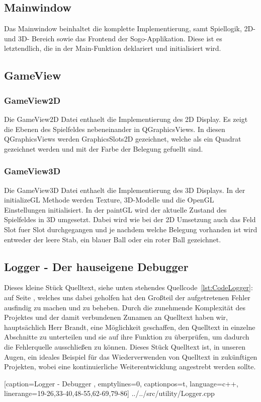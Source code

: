 \documentclass[a4paper]{scrartcl}
\begin{document}
\subsection{Mainwindow}\label{ch:Mainwindow}
Das Mainwindow beinhaltet die komplette Implementierung, samt Spiellogik, 2D- und 3D- Bereich sowie das Frontend der Sogo-Applikation. Diese ist es letztendlich, die in der Main-Funktion deklariert und initialisiert wird.
 
\subsection{GameView}\label{ch:GameView}
\subsubsection{GameView2D}\label{ch:GameView2D}
Die GameView2D Datei enthaelt die Implementierung des 2D Display. Es zeigt die Ebenen des Spielfeldes nebeneinander in QGraphicsViews. In diesen QGraphicsViews werden GraphicsSlots2D gezeichnet, welche als ein Quadrat gezeichnet
werden und mit der Farbe der Belegung gefuellt sind.
\subsubsection{GameView3D}\label{ch:GameView3D}
Die GameView3D Datei enthaelt die Implementierung des 3D Displays. In der initializeGL Methode werden Texture, 3D-Modelle und die OpenGL Einstellungen initialisiert. In der paintGL wird der aktuelle Zustand des Spielfeldes
in 3D umgesetzt. Dabei wird wie bei der 2D Umsetzung auch das Feld Slot fuer Slot durchgegangen und je nachdem welche Belegung vorhanden ist wird entweder der leere Stab, ein blauer Ball oder ein roter Ball gezeichnet. 

\newpage
\subsection{Logger - Der hauseigene Debugger}\label{ch:Logger}
Dieses kleine Stück Quelltext, siehe unten stehendes Quellcode~\ref{lst:CodeLogger}: auf Seite \pageref{lst:CodeLogger}, welches uns dabei geholfen hat den Großteil der aufgetretenen Fehler ausfindig zu machen und zu beheben. Durch die zunehmende Komplexität des Projektes und der damit verbundenen Zunamen an Quelltext haben wir, hauptsächlich Herr Brandt, eine Möglichkeit geschaffen, den Quelltext in einzelne Abschnitte zu unterteilen und sie auf ihre Funktion zu überprüfen, um dadurch die Fehlerquelle ausschließen zu können. Dieses Stück Quelltext ist, in unseren Augen, ein ideales Beispiel für das Wiederverwenden von Quelltext in zukünftigen Projekten, wobei eine kontinuierliche Weiterentwicklung angestrebt werden sollte.

    [caption={Logger - Debugger} 	%
    	\label{lst:CodeLogger},			%
    emptylines=0,					%
    captionpos=t,					%
    language=c++,					%
    linerange={19-26,33-40,48-55,62-69,79-86}]%
{../../src/utility/Logger.cpp}		%
\end{document}
